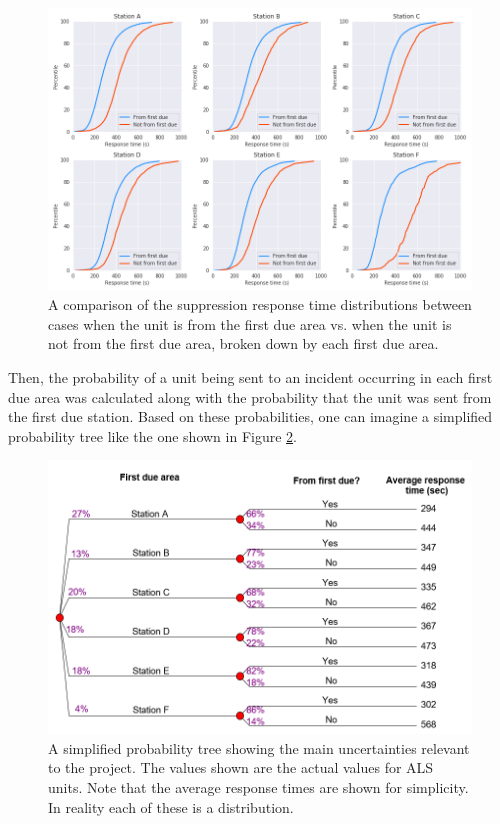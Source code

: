 \documentclass[article]{proc}
\begin{document}
\begin{figure}[!htb]
  \centering
  \includegraphics[width=16cm,keepaspectratio]{Figures/alsdiff.png}
  \caption{A comparison of the suppression response time distributions between cases when the unit is from the first due area vs. when the unit is not from the first due area, broken down by each first due area.}
  \label{fig:firediff}
\end{figure}

Then, the probability of a unit being sent to an incident occurring in each first due area was calculated along with the probability that the unit was sent from the first due station. Based on these probabilities, one can imagine a simplified probability tree like the one shown in Figure \ref{fig:alstree}. 

\begin{figure}[!htb]
  \centering
  \includegraphics[width=16cm,keepaspectratio]{Figures/alstree.PNG}
  \caption{A simplified probability tree showing the main uncertainties relevant to the project. The values shown are the actual values for ALS units. Note that the average response times are shown for simplicity. In reality each of these is a distribution.}
  \label{fig:alstree}
\end{figure}
\end{document}
